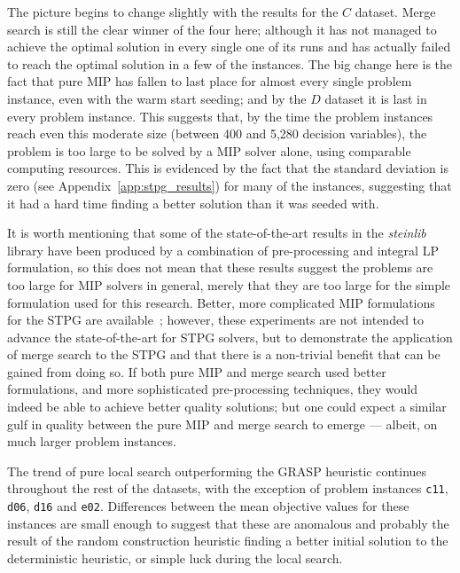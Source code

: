 \documentclass[journal]{IEEEtran}
\begin{document}
The picture begins to change slightly with the results for the \(C\) dataset. Merge search is still the clear winner of the four here; although it has not managed to achieve the optimal solution in every single one of its runs and has actually failed to reach the optimal solution in a few of the instances. The big change here is the fact that pure MIP has fallen to last place for almost every single problem instance, even with the warm start seeding; and by the \(D\) dataset it is last in every problem instance. This suggests that, by the time the problem instances reach even this moderate size (between 400 and 5,280 decision variables), the problem is too large to be solved by a MIP solver alone, using comparable computing resources. This is evidenced by the fact that the standard deviation is zero (see Appendix~\ref{app:stpg_results}) for many of the instances, suggesting that it had a hard time finding a better solution than it was seeded with. 

It is worth mentioning that some of the state-of-the-art results in the \emph{steinlib} library have been produced by a combination of pre-processing and integral LP formulation, so this does not mean that these results suggest the problems are too large for MIP solvers in general, merely that they are too large for the simple formulation used for this research. Better, more complicated MIP formulations for the STPG are available~\cite{goemans,stpg-improved,hypergraph}; however, these experiments are not intended to advance the state-of-the-art for STPG solvers, but to demonstrate the application of merge search to the STPG and that there is a non-trivial benefit that can be gained from doing so. If both pure MIP and merge search used better formulations, and more sophisticated pre-processing techniques, they would indeed be able to achieve better quality solutions; but one could expect a similar gulf in quality between the pure MIP and merge search to emerge --- albeit, on much larger problem instances.

The trend of pure local search outperforming the GRASP heuristic continues throughout the rest of the datasets, with the exception of problem instances \texttt{c11}, \texttt{d06}, \texttt{d16} and \texttt{e02}. Differences between the mean objective values for these instances are small enough to suggest that these are anomalous and probably the result of the random construction heuristic finding a better initial solution to the deterministic heuristic, or simple luck during the local search. 
\end{document}
